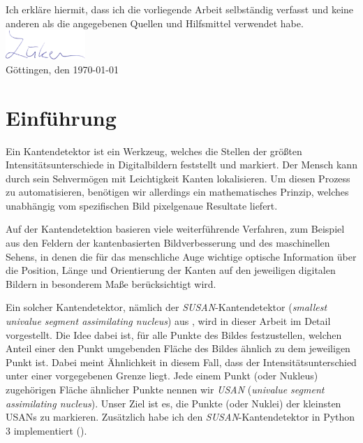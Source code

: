 \documentclass[a4paper, 11pt]{report}
\renewcommand{\emph}[1]{\textit{#1}}
\theoremstyle{definition}
\begin{document}
\pagebreak

\noindent Ich erkläre hiermit, dass ich die vorliegende Arbeit selbständig verfasst und keine anderen als die angegebenen Quellen und Hilfsmittel verwendet habe.\\[0.7em]
\phantom{H}\includegraphics[height=3em]{sign.png}\\[0.5em]
Göttingen, den \today \hspace{2em}

\pagebreak
\restoregeometry
{}
\setcounter{page}{0}
\tableofcontents

\pagebreak

\restoregeometry

\pagestyle{headings}

\chapter{Einführung}
	Ein Kantendetektor ist ein Werkzeug, welches die Stellen der größten Intensitätsunterschiede in Digitalbildern feststellt und markiert. Der Mensch kann durch sein Sehvermögen mit Leichtigkeit Kanten lokalisieren. Um diesen Prozess zu automatisieren, benötigen wir allerdings ein mathematisches Prinzip, welches unabhängig vom spezifischen Bild pixelgenaue Resultate liefert.

	Auf der Kantendetektion basieren viele weiterführende Verfahren, zum Beispiel aus den Feldern der kantenbasierten Bildverbesserung und des maschinellen Sehens, in denen die für das menschliche Auge wichtige optische Information über die Position, Länge und Orientierung der Kanten auf den jeweiligen digitalen Bildern in besonderem Maße berücksichtigt wird.

	Ein solcher Kantendetektor, nämlich der \emph{SUSAN}-Kantendetektor (\emph{smallest univalue segment assimilating nucleus}) aus \cite{SUSAN}, wird in dieser Arbeit im Detail vorgestellt. Die Idee dabei ist, für alle Punkte des Bildes festzustellen, welchen Anteil einer den Punkt umgebenden Fläche des Bildes \glqq ähnlich\grqq{} zu dem jeweiligen Punkt ist. Dabei meint \glqq Ähnlichkeit\grqq{} in diesem Fall, dass der Intensitätsunterschied unter einer vorgegebenen Grenze liegt. Jede einem Punkt (oder Nukleus) zugehörigen Fläche ähnlicher Punkte nennen wir \emph{USAN} (\emph{univalue segment assimilating nucleus}). Unser Ziel ist es, die Punkte (oder Nuklei) der kleinsten USANs zu markieren. Zusätzlich habe ich den \emph{SUSAN}-Kantendetektor in Python 3 implementiert (\cite{mysoftware}).
\end{document}
